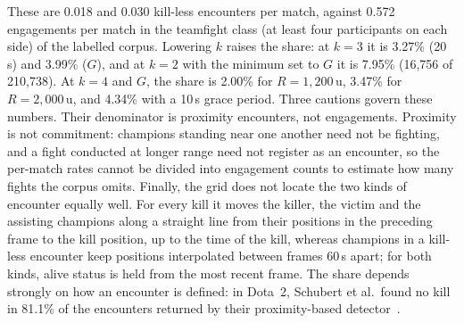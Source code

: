 These are 0.018 and 0.030 kill-less encounters per match, against 0.572 engagements per match in the
teamfight class (at least four participants on each side) of the labelled corpus.
Lowering $k$ raises the share: at $k = 3$ it is 3.27\% (20\,s) and 3.99\% ($G$), and at $k = 2$ with
the minimum set to $G$ it is 7.95\% (16,756 of 210,738). At $k = 4$ and $G$, the share is 2.00\% for
$R = 1{,}200$\,u, 3.47\% for $R = 2{,}000$\,u, and 4.34\% with a 10\,s grace period.
Three cautions govern these numbers. Their denominator is proximity encounters, not engagements.
Proximity is not commitment: champions standing near one another need not be fighting, and a fight
conducted at longer range need not register as an encounter, so the per-match rates cannot be
divided into engagement counts to estimate how many fights the corpus omits. Finally, the grid does
not locate the two kinds of encounter equally well. For every kill it moves the killer, the victim
and the assisting champions along a straight line from their positions in the preceding frame to
the kill position, up to the time of the kill, whereas champions in a kill-less encounter keep
positions interpolated between frames 60\,s apart; for both kinds, alive status is held from the
most recent frame.
The share depends strongly on how an encounter is defined: in Dota~2, Schubert et al.\ found no
kill in 81.1\% of the encounters returned by their proximity-based detector~\cite{schubert2016encounter}.


